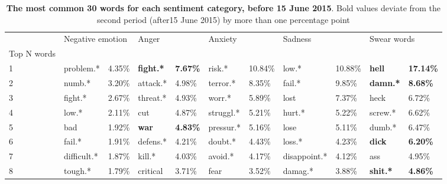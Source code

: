 \begin{table}[h]\centering
\caption{\textbf{The most common 30 words for each sentiment category, before 15 June 2015}. Bold values deviate from the second period (after15 June 2015) by more than one percentage point}
	\label{fig: before_1}
\begin{adjustbox}{width=\linewidth, center}
	\begin{tabular}{lllllllllll}
	\toprule
	{} & \multicolumn{2}{l}{Negative emotion} & \multicolumn{2}{l}{Anger} & \multicolumn{2}{l}{Anxiety} & \multicolumn{2}{l}{Sadness} & \multicolumn{2}{l}{Swear words} \\
	Top N words          &                  &            &                   &                  &              &            &               &            &                  &                   \\
	\midrule
	1                    &        problem.* &     4.35\% &  \textbf{fight.*} &  \textbf{7.67\%} &       risk.* &    10.84\% &         low.* &    10.88\% &    \textbf{hell} &  \textbf{17.14\%} \\
	2                    &           numb.* &     3.20\% &          attack.* &           4.98\% &     terror.* &     8.35\% &        fail.* &     9.85\% &  \textbf{damn.*} &   \textbf{8.68\%} \\
	3                    &          fight.* &     2.67\% &          threat.* &           4.93\% &       worr.* &     5.89\% &          lost &     7.37\% &             heck &            6.72\% \\
	4                    &            low.* &     2.11\% &               cut &           4.87\% &    struggl.* &     5.21\% &        hurt.* &     5.22\% &          screw.* &            6.62\% \\
	5                    &              bad &     1.92\% &      \textbf{war} &  \textbf{4.83\%} &    pressur.* &     5.16\% &          lose &     5.11\% &           dumb.* &            6.47\% \\
	6                    &           fail.* &     1.91\% &          defens.* &           4.21\% &      doubt.* &     4.43\% &        loss.* &     4.23\% &    \textbf{dick} &   \textbf{6.20\%} \\
	7                    &      difficult.* &     1.87\% &            kill.* &           4.03\% &      avoid.* &     4.17\% &  disappoint.* &     4.12\% &              ass &            4.95\% \\
	8                    &          tough.* &     1.79\% &          critical &           3.71\% &         fear &     3.52\% &       damag.* &     3.88\% &  \textbf{shit.*} &   \textbf{4.86\%} \\

\end{tabular}
\end{adjustbox}
\end{table}
